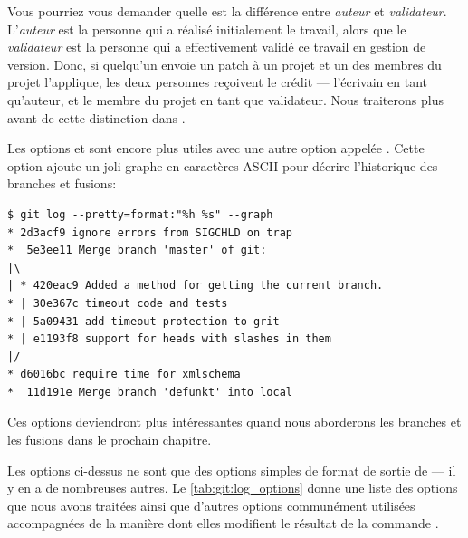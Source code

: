 Vous pourriez vous demander quelle est la différence entre \emph{auteur}  et \emph{validateur}.
L'\emph{auteur} est la personne qui a réalisé initialement le travail, alors que le \emph{validateur} est la personne qui a effectivement validé ce travail en gestion de version.
Donc, si quelqu'un envoie un patch à un projet et un des membres du projet l'applique, les deux personnes reçoivent le crédit --- l'écrivain en tant qu'auteur, et le membre du projet en tant que validateur.
Nous traiterons plus avant de cette distinction dans .

Les options  et  sont encore plus utiles avec une autre option  appelée .
Cette option ajoute un joli graphe en caractères ASCII pour décrire l'historique des branches et fusions:
\begin{Schunk}
\begin{Verbatim}
$ git log --pretty=format:"%h %s" --graph
* 2d3acf9 ignore errors from SIGCHLD on trap
*  5e3ee11 Merge branch 'master' of git:
|\
| * 420eac9 Added a method for getting the current branch.
* | 30e367c timeout code and tests
* | 5a09431 add timeout protection to grit
* | e1193f8 support for heads with slashes in them
|/
* d6016bc require time for xmlschema
*  11d191e Merge branch 'defunkt' into local
\end{Verbatim}
\end{Schunk}

Ces options deviendront plus intéressantes quand nous aborderons les branches et les fusions dans le prochain chapitre.

Les options ci-dessus ne sont que des options simples de format de sortie de  --- il y en a de nombreuses autres.
Le \autoref{tab:git:log_options} donne une liste des options que nous avons traitées ainsi que d'autres options communément utilisées accompagnées de la manière dont elles modifient le résultat de la commande .


